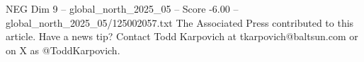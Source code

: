 \begin{textsample}{NEG Dim 9 – global\_north\_2025\_05 – Score -6.00 – global\_north\_2025\_05/125002057.txt}
The Associated Press contributed to this article.
Have a news tip?
Contact Todd Karpovich at tkarpovich@baltsun.com or on X as @ToddKarpovich.

\end{textsample}
